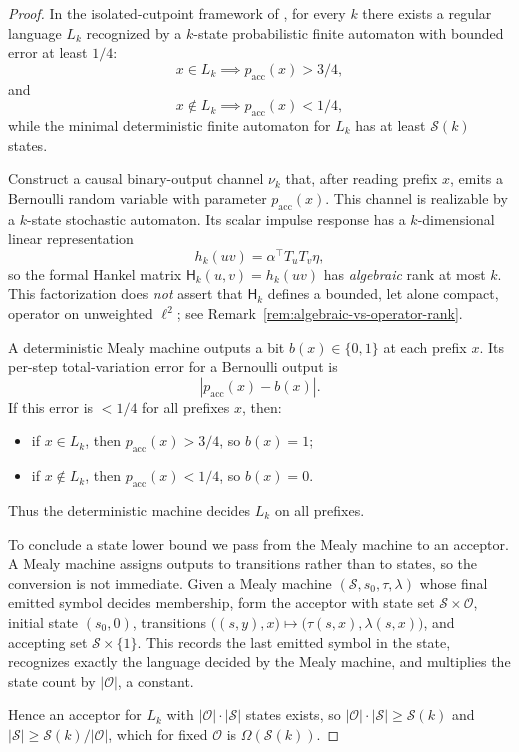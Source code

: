 \documentclass[12pt]{article}
\theoremstyle{definition}
\begin{document}
\begin{proof}
In the isolated-cutpoint framework of \cite{rabin1963,freivalds1981}, for every
$k$ there exists a regular language
$L_k$ recognized by a $k$-state probabilistic finite automaton with bounded
error at least $1/4$:
\[
x\in L_k
\implies
p_{\mathrm{acc}}(x)>3/4,
\]
and
\[
x\notin L_k
\implies
p_{\mathrm{acc}}(x)<1/4,
\]
while the minimal deterministic finite automaton for $L_k$ has at least
$\mathcal S(k)$ states.

Construct a causal binary-output channel $\nu_k$ that, after reading prefix
$x$, emits a Bernoulli random variable with parameter
$p_{\mathrm{acc}}(x)$.  This channel is realizable by a $k$-state stochastic
automaton.  Its scalar impulse response has a $k$-dimensional linear
representation
\[
h_k(uv)=\alpha^\top T_uT_v\eta,
\]
so the formal Hankel matrix $\mathsf H_k(u,v)=h_k(uv)$ has \emph{algebraic}
rank at most $k$.  This factorization does \emph{not} assert that
$\mathsf H_k$ defines a bounded, let alone compact, operator on unweighted
$\ell^2$; see Remark~\ref{rem:algebraic-vs-operator-rank}.

A deterministic Mealy machine outputs a bit $b(x)\in\{0,1\}$ at each prefix
$x$.  Its per-step total-variation error for a Bernoulli output is
\[
|p_{\mathrm{acc}}(x)-b(x)|.
\]
If this error is $<1/4$ for all prefixes $x$, then:
\begin{itemize}
\item if $x\in L_k$, then $p_{\mathrm{acc}}(x)>3/4$, so $b(x)=1$;
\item if $x\notin L_k$, then $p_{\mathrm{acc}}(x)<1/4$, so $b(x)=0$.
\end{itemize}
Thus the deterministic machine decides $L_k$ on all prefixes.

To conclude a state lower bound we pass from the Mealy machine to an acceptor.
A Mealy machine assigns outputs to transitions rather than to states, so the
conversion is not immediate.  Given a Mealy machine $(\mathcal S,s_0,\tau,
\lambda)$ whose final emitted symbol decides membership, form the acceptor with
state set $\mathcal S\times\mathcal O$, initial state $(s_0,0)$, transitions
$\bigl((s,y),x\bigr)\mapsto\bigl(\tau(s,x),\lambda(s,x)\bigr)$, and accepting
set $\mathcal S\times\{1\}$.  This records the last emitted symbol in the
state, recognizes exactly the language decided by the Mealy machine, and
multiplies the state count by $|\mathcal O|$, a constant.

Hence an acceptor for $L_k$ with $|\mathcal O|\cdot|\mathcal S|$ states exists,
so $|\mathcal O|\cdot|\mathcal S|\ge\mathcal S(k)$ and
$|\mathcal S|\ge\mathcal S(k)/|\mathcal O|$, which for fixed $\mathcal O$ is
$\Omega(\mathcal S(k))$.
\end{proof}
\end{document}
